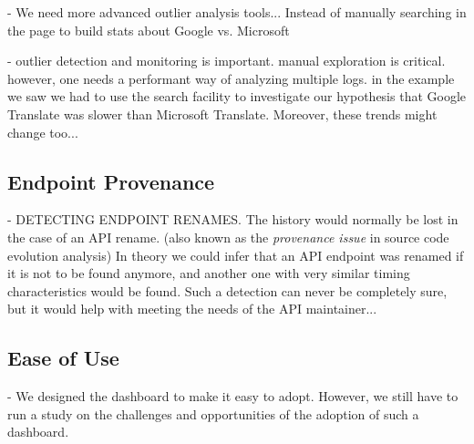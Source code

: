     - We need more advanced outlier analysis tools... Instead of manually searching in the page to build stats about Google vs. Microsoft

    - outlier detection and monitoring is important. manual exploration is critical. however, one needs a performant way of analyzing multiple logs. in the example we saw we had to use the search facility to investigate our hypothesis that Google Translate was slower than Microsoft Translate. Moreover, these trends might change too... 


  \subsection*{Endpoint Provenance }

    -   DETECTING ENDPOINT RENAMES.  The history would normally be lost in the case of an API rename. (also known as the {\em provenance issue} in source code evolution analysis)
    In theory we could infer that an API endpoint was renamed if it is not to be found anymore, and another one with very similar timing characteristics would be found. Such a detection can never be completely sure, but it would help with meeting the needs of the API maintainer... 

  \subsection*{Ease of Use}

    - We designed the dashboard to make it easy to adopt. However, we still have to run a study on the challenges and opportunities of the adoption of such a dashboard. 














  










%



